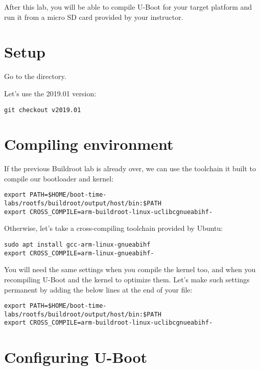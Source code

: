 
After this lab, you will be able to compile U-Boot for your target
platform and run it from a micro SD card provided by your instructor.

\section{Setup}

Go to the  directory.

Let's use the 2019.01 version:
\begin{verbatim}
git checkout v2019.01
\end{verbatim}

\section{Compiling environment}

If the previous Buildroot lab is already over, we can use the
toolchain it built to compile our bootloader and kernel:

\begin{verbatim}
export PATH=$HOME/boot-time-labs/rootfs/buildroot/output/host/bin:$PATH
export CROSS_COMPILE=arm-buildroot-linux-uclibcgnueabihf-
\end{verbatim}

Otherwise, let's take a cross-compiling toolchain provided by Ubuntu:

\begin{verbatim}
sudo apt install gcc-arm-linux-gnueabihf
export CROSS_COMPILE=arm-linux-gnueabihf-
\end{verbatim}

You will need the same settings when you compile the kernel too, and
when you recompiling U-Boot and the kernel to optimize them. Let's make
such settings permanent by adding the below lines at the end of your
 file:

\begin{verbatim}
export PATH=$HOME/boot-time-labs/rootfs/buildroot/output/host/bin:$PATH
export CROSS_COMPILE=arm-buildroot-linux-uclibcgnueabihf-
\end{verbatim}

\section{Configuring U-Boot}

